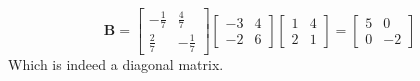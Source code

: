 \documentclass{article}
\begin{document}
                    \[
                        \mathbf{B}
                        =
                        \begin{bmatrix}-\frac{1}{7} & \frac{4}{7}\\\frac{2}{7} & -\frac{1}{7}\end{bmatrix}
                        \begin{bmatrix}-3 & 4\\-2 & 6\end{bmatrix}
                        \begin{bmatrix}1 & 4\\2 & 1\end{bmatrix}
                        =
                        \begin{bmatrix}5 & 0\\0 & -2\end{bmatrix}
                    \]
                    Which is indeed a diagonal matrix.
\end{document}
